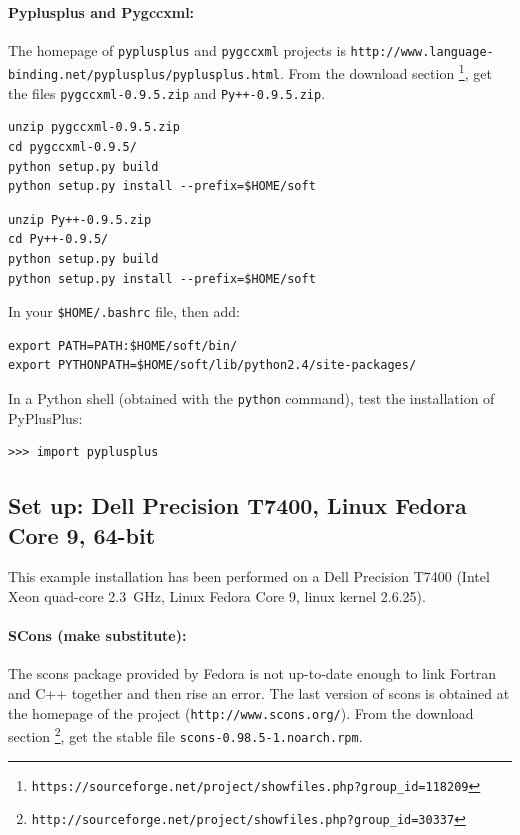 \documentclass[12pt,a4paper]{article}
\begin{document}
\paragraph{Pyplusplus and Pygccxml: }
The homepage of {\tt pyplusplus} and {\tt pygccxml} projects is 
{\tt http://www.language-binding.net/pyplusplus/pyplusplus.html}. From the
download section \footnote{\tt https://sourceforge.net/project/showfiles.php?group\_id=118209}, 
get the files {\tt pygccxml-0.9.5.zip} and {\tt Py++-0.9.5.zip}.

\begin{verbatim}
unzip pygccxml-0.9.5.zip
cd pygccxml-0.9.5/
python setup.py build
python setup.py install --prefix=$HOME/soft
\end{verbatim}

\begin{verbatim}
unzip Py++-0.9.5.zip 
cd Py++-0.9.5/
python setup.py build
python setup.py install --prefix=$HOME/soft
\end{verbatim}

In your {\tt \$HOME/.bashrc} file, then add:
\begin{verbatim}
export PATH=PATH:$HOME/soft/bin/
export PYTHONPATH=$HOME/soft/lib/python2.4/site-packages/
\end{verbatim}

In a Python shell (obtained with the {\tt python} command), test the installation
of PyPlusPlus:
\begin{verbatim}
>>> import pyplusplus
\end{verbatim}


\subsection{Set up: Dell Precision T7400, Linux Fedora Core 9, 64-bit}
This example installation has been performed on a Dell Precision T7400 (Intel
Xeon quad-core 2.3~GHz, Linux Fedora Core 9, linux kernel 2.6.25).

\paragraph{SCons (make substitute):}
The scons package provided by Fedora is not up-to-date enough to link Fortran and C++ together and then rise an
error. The last version of scons is obtained at the homepage of the project ({\tt  http://www.scons.org/}).
From the download section \footnote{\tt http://sourceforge.net/project/showfiles.php?group\_id=30337}, 
get the stable file {\tt scons-0.98.5-1.noarch.rpm}.
\end{document}
